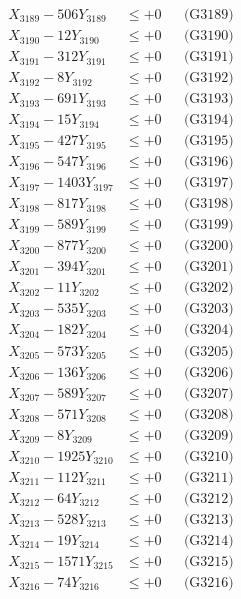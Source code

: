 \documentclass[a4paper,10pt]{article}
\begin{document}
{\begin{align}
X_{3189} - 506Y_{3189} &\leq +0 && \text{(G3189)} \\
X_{3190} - 12Y_{3190} &\leq +0 && \text{(G3190)} \\
\allowbreak
X_{3191} - 312Y_{3191} &\leq +0 && \text{(G3191)} \\
X_{3192} - 8Y_{3192} &\leq +0 && \text{(G3192)} \\
X_{3193} - 691Y_{3193} &\leq +0 && \text{(G3193)} \\
X_{3194} - 15Y_{3194} &\leq +0 && \text{(G3194)} \\
X_{3195} - 427Y_{3195} &\leq +0 && \text{(G3195)} \\
X_{3196} - 547Y_{3196} &\leq +0 && \text{(G3196)} \\
X_{3197} - 1403Y_{3197} &\leq +0 && \text{(G3197)} \\
X_{3198} - 817Y_{3198} &\leq +0 && \text{(G3198)} \\
X_{3199} - 589Y_{3199} &\leq +0 && \text{(G3199)} \\
X_{3200} - 877Y_{3200} &\leq +0 && \text{(G3200)} \\
\allowbreak
X_{3201} - 394Y_{3201} &\leq +0 && \text{(G3201)} \\
X_{3202} - 11Y_{3202} &\leq +0 && \text{(G3202)} \\
X_{3203} - 535Y_{3203} &\leq +0 && \text{(G3203)} \\
X_{3204} - 182Y_{3204} &\leq +0 && \text{(G3204)} \\
X_{3205} - 573Y_{3205} &\leq +0 && \text{(G3205)} \\
X_{3206} - 136Y_{3206} &\leq +0 && \text{(G3206)} \\
X_{3207} - 589Y_{3207} &\leq +0 && \text{(G3207)} \\
X_{3208} - 571Y_{3208} &\leq +0 && \text{(G3208)} \\
X_{3209} - 8Y_{3209} &\leq +0 && \text{(G3209)} \\
X_{3210} - 1925Y_{3210} &\leq +0 && \text{(G3210)} \\
\allowbreak
X_{3211} - 112Y_{3211} &\leq +0 && \text{(G3211)} \\
X_{3212} - 64Y_{3212} &\leq +0 && \text{(G3212)} \\
X_{3213} - 528Y_{3213} &\leq +0 && \text{(G3213)} \\
X_{3214} - 19Y_{3214} &\leq +0 && \text{(G3214)} \\
X_{3215} - 1571Y_{3215} &\leq +0 && \text{(G3215)} \\
X_{3216} - 74Y_{3216} &\leq +0 && \text{(G3216)} \\

\end{align}}
\end{document}
